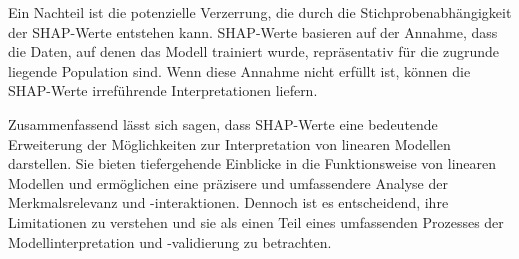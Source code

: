 Ein Nachteil ist die potenzielle Verzerrung, die durch die Stichprobenabhängigkeit 
der SHAP-Werte entstehen kann. SHAP-Werte basieren auf der Annahme, dass die Daten, auf denen
das Modell trainiert wurde, repräsentativ für die zugrunde liegende Population sind. 
Wenn diese Annahme nicht erfüllt ist, können die SHAP-Werte irreführende Interpretationen liefern.

Zusammenfassend lässt sich sagen, dass SHAP-Werte eine bedeutende Erweiterung der Möglichkeiten
zur Interpretation von linearen Modellen darstellen. Sie bieten tiefergehende Einblicke in die 
Funktionsweise von linearen Modellen und ermöglichen eine präzisere und umfassendere Analyse der Merkmalsrelevanz 
und -interaktionen. Dennoch ist es entscheidend, ihre Limitationen zu verstehen und sie als 
einen Teil eines umfassenden Prozesses der Modellinterpretation und -validierung zu betrachten. 